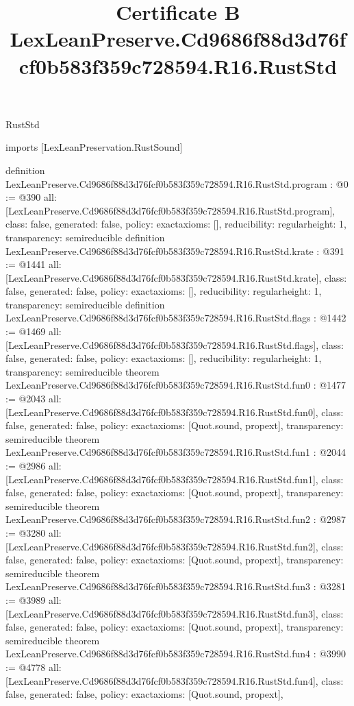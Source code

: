 \begin{lexlean}{RustStd}
\title{Certificate B LexLeanPreserve.Cd9686f88d3d76fcf0b583f359c728594.R16.RustStd}
\begin{coremodule}
imports [LexLeanPreservation.RustSound]

definition LexLeanPreserve.Cd9686f88d3d76fcf0b583f359c728594.R16.RustStd.program : @0 := @390 {
  all: [LexLeanPreserve.Cd9686f88d3d76fcf0b583f359c728594.R16.RustStd.program],
  class: false,
  generated: false,
  policy: exact{axioms: []},
  reducibility: regular{height: 1},
  transparency: semireducible
}
definition LexLeanPreserve.Cd9686f88d3d76fcf0b583f359c728594.R16.RustStd.krate : @391 := @1441 {
  all: [LexLeanPreserve.Cd9686f88d3d76fcf0b583f359c728594.R16.RustStd.krate],
  class: false,
  generated: false,
  policy: exact{axioms: []},
  reducibility: regular{height: 1},
  transparency: semireducible
}
definition LexLeanPreserve.Cd9686f88d3d76fcf0b583f359c728594.R16.RustStd.flags : @1442 := @1469 {
  all: [LexLeanPreserve.Cd9686f88d3d76fcf0b583f359c728594.R16.RustStd.flags],
  class: false,
  generated: false,
  policy: exact{axioms: []},
  reducibility: regular{height: 1},
  transparency: semireducible
}
theorem LexLeanPreserve.Cd9686f88d3d76fcf0b583f359c728594.R16.RustStd.fun0 : @1477 := @2043 {
  all: [LexLeanPreserve.Cd9686f88d3d76fcf0b583f359c728594.R16.RustStd.fun0],
  class: false,
  generated: false,
  policy: exact{axioms: [Quot.sound, propext]},
  transparency: semireducible
}
theorem LexLeanPreserve.Cd9686f88d3d76fcf0b583f359c728594.R16.RustStd.fun1 : @2044 := @2986 {
  all: [LexLeanPreserve.Cd9686f88d3d76fcf0b583f359c728594.R16.RustStd.fun1],
  class: false,
  generated: false,
  policy: exact{axioms: [Quot.sound, propext]},
  transparency: semireducible
}
theorem LexLeanPreserve.Cd9686f88d3d76fcf0b583f359c728594.R16.RustStd.fun2 : @2987 := @3280 {
  all: [LexLeanPreserve.Cd9686f88d3d76fcf0b583f359c728594.R16.RustStd.fun2],
  class: false,
  generated: false,
  policy: exact{axioms: [Quot.sound, propext]},
  transparency: semireducible
}
theorem LexLeanPreserve.Cd9686f88d3d76fcf0b583f359c728594.R16.RustStd.fun3 : @3281 := @3989 {
  all: [LexLeanPreserve.Cd9686f88d3d76fcf0b583f359c728594.R16.RustStd.fun3],
  class: false,
  generated: false,
  policy: exact{axioms: [Quot.sound, propext]},
  transparency: semireducible
}
theorem LexLeanPreserve.Cd9686f88d3d76fcf0b583f359c728594.R16.RustStd.fun4 : @3990 := @4778 {
  all: [LexLeanPreserve.Cd9686f88d3d76fcf0b583f359c728594.R16.RustStd.fun4],
  class: false,
  generated: false,
  policy: exact{axioms: [Quot.sound, propext]},
}
\end{coremodule}
\end{lexlean}
